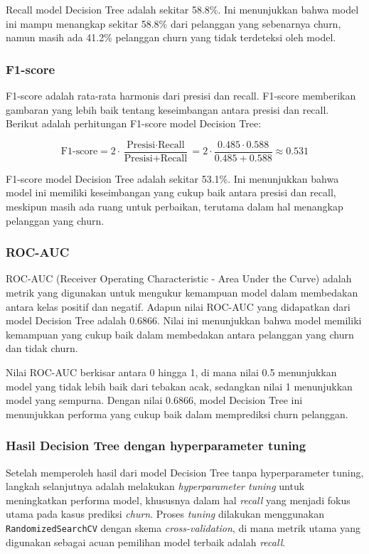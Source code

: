 Recall model Decision Tree adalah sekitar 58.8\%. Ini menunjukkan bahwa model ini mampu menangkap sekitar 58.8\% dari pelanggan yang sebenarnya churn, namun masih ada 41.2\% pelanggan churn yang tidak terdeteksi oleh model.

\subsubsection*{F1-score}
F1-score adalah rata-rata harmonis dari presisi dan recall. F1-score memberikan gambaran yang lebih baik tentang keseimbangan antara presisi dan recall. Berikut adalah perhitungan F1-score model Decision Tree:

\begin{equation}
    \text{F1-score} = 2 \cdot \frac{\text{Presisi} \cdot \text{Recall}}{\text{Presisi} + \text{Recall}} = 2 \cdot \frac{0.485 \cdot 0.588}{0.485 + 0.588} \approx 0.531
\end{equation}

F1-score model Decision Tree adalah sekitar 53.1\%. Ini menunjukkan bahwa model ini memiliki keseimbangan yang cukup baik antara presisi dan recall, meskipun masih ada ruang untuk perbaikan, terutama dalam hal menangkap pelanggan yang churn.

\subsubsection*{ROC-AUC}
ROC-AUC (Receiver Operating Characteristic - Area Under the Curve) adalah metrik yang digunakan untuk mengukur kemampuan model dalam membedakan antara kelas positif dan negatif. Adapun nilai ROC-AUC yang didapatkan dari model Decision Tree adalah 0.6866. Nilai ini menunjukkan bahwa model memiliki kemampuan yang cukup baik dalam membedakan antara pelanggan yang churn dan tidak churn.

Nilai ROC-AUC berkisar antara 0 hingga 1, di mana nilai 0.5 menunjukkan model yang tidak lebih baik dari tebakan acak, sedangkan nilai 1 menunjukkan model yang sempurna. Dengan nilai 0.6866, model Decision Tree ini menunjukkan performa yang cukup baik dalam memprediksi churn pelanggan.

\subsubsection{Hasil Decision Tree dengan hyperparameter tuning}
Setelah memperoleh hasil dari model Decision Tree tanpa hyperparameter tuning, langkah selanjutnya adalah melakukan \textit{hyperparameter tuning} untuk meningkatkan performa model, khususnya dalam hal \textit{recall} yang menjadi fokus utama pada kasus prediksi \textit{churn}. Proses \textit{tuning} dilakukan menggunakan \texttt{RandomizedSearchCV} dengan skema \textit{cross-validation}, di mana metrik utama yang digunakan sebagai acuan pemilihan model terbaik adalah \textit{recall}.

